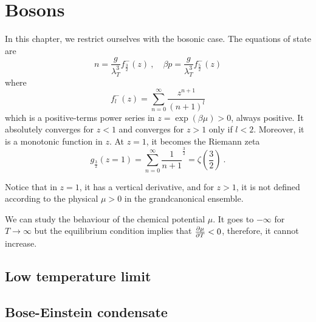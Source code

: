 \chapter{Bosons}

    In this chapter, we restrict ourselves with the bosonic case. The equations of state are 
    \begin{equation*}
        n = \frac{g}{\lambda^3_T} f^-_{\frac{3}{2}} (z) ~, \quad \beta p = \frac{g}{\lambda^3_T} f^-_{\frac{5}{2}} (z)
    \end{equation*}
    where 
    \begin{equation*}
        f_l^- (z) = \sum_{n=0}^\infty \frac{z^{n+1}}{(n+1)^l}
    \end{equation*}
    which is a positive-terms power series in $z = \exp(\beta\mu) > 0$, always positive. It absolutely converges for $z < 1$ and converges for $z > 1$ only if $l < 2$. Moreover, it is a monotonic function in $z$. At $z = 1$, it becomes the Riemann zeta 
    \begin{equation*}
        g_{\frac{3}{2}} (z=1) = \sum_{n=0}^\infty \frac{1}{n+1}^{\frac{3}{2}} = \zeta(\frac{3}{2}) ~.
    \end{equation*}

    Notice that in $z = 1$, it has a vertical derivative, and for $z > 1$, it is not defined according to the physical $\mu > 0$ in the grandcanonical ensemble. 

    We can study the behaviour of the chemical potential $\mu$. It goes to $-\infty$ for $T \rightarrow \infty$ but the equilibrium condition implies that $\frac{\partial\mu}{\partial T} < 0$, therefore, it cannot increase. 

\section{Low temperature limit}

\section{Bose-Einstein condensate}